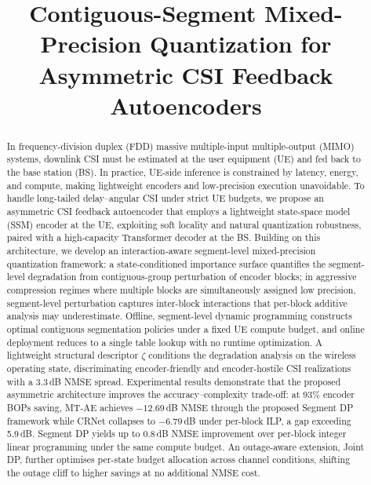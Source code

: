 \documentclass[conference]{IEEEtran}
\begin{document}
\title{
Contiguous-Segment Mixed-Precision Quantization for Asymmetric CSI Feedback Autoencoders
}

\author{
}

\maketitle

\begin{abstract}
In frequency-division duplex (FDD) massive multiple-input multiple-output (MIMO) systems, downlink CSI must be estimated at the user equipment (UE) and fed back to the base station (BS). In practice, UE-side inference is constrained by latency, energy, and compute, making lightweight encoders and low-precision execution unavoidable. To handle long-tailed delay--angular CSI under strict UE budgets, we propose an asymmetric CSI feedback autoencoder that employs a lightweight state-space model (SSM) encoder at the UE, exploiting soft locality and natural quantization robustness, paired with a high-capacity Transformer decoder at the BS. Building on this architecture, we develop an interaction-aware segment-level mixed-precision quantization framework: a state-conditioned importance surface quantifies the segment-level degradation from contiguous-group perturbation of encoder blocks; in aggressive compression regimes where multiple blocks are simultaneously assigned low precision, segment-level perturbation captures inter-block interactions that per-block additive analysis may underestimate. Offline, segment-level dynamic programming constructs optimal contiguous segmentation policies under a fixed UE compute budget, and online deployment reduces to a single table lookup with no runtime optimization. A lightweight structural descriptor $\zeta$ conditions the degradation analysis on the wireless operating state, discriminating encoder-friendly and encoder-hostile CSI realizations with a 3.3\,dB NMSE spread. Experimental results demonstrate that the proposed asymmetric architecture improves the accuracy--complexity trade-off: at 93\% encoder BOPs saving, MT-AE achieves $-12.69$\,dB NMSE through the proposed Segment DP framework while CRNet collapses to $-6.79$\,dB under per-block ILP, a gap exceeding 5.9\,dB. Segment DP yields up to 0.8\,dB NMSE improvement over per-block integer linear programming under the same compute budget. An outage-aware extension, Joint DP, further optimises per-state budget allocation across channel conditions, shifting the outage cliff to higher savings at no additional NMSE cost.
\end{abstract}
\end{document}
